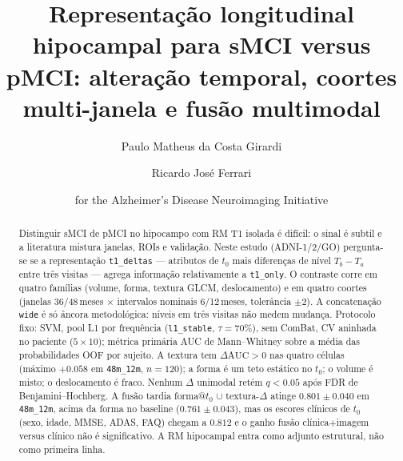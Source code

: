 \documentclass[review]{elsarticle}
\newcommand{\code}[1]{\texttt{#1}}
\begin{document}
	\begin{frontmatter}
		
		\title{Representação longitudinal hipocampal para sMCI versus pMCI:
			alteração temporal, coortes multi-janela e fusão multimodal}
		
		\author[ufscar]{Paulo Matheus da Costa Girardi}
		
		\author[ufscar]{Ricardo José Ferrari}
		
		
		\address[ufscar]{Department of Computing, Federal University of São Carlos, Rod.\ Washington Luis, Km 235, 13565-905, São Carlos, SP, Brazil}
		
		\author[]{for the Alzheimer's Disease Neuroimaging Initiative}
		
		\begin{abstract}
			Distinguir sMCI de pMCI no hipocampo com RM T1 isolada é difícil: o sinal é subtil e a literatura mistura janelas, ROIs e validação.
			Neste estudo (ADNI-1/2/GO) pergunta-se se a representação \code{t1\_deltas} --- atributos de $t_0$ mais diferenças de nível $T_b-T_a$ entre três visitas --- agrega informação relativamente a \code{t1\_only}.
			O contraste corre em quatro famílias (volume, forma, textura GLCM, deslocamento) e em quatro coortes (janelas 36/48\,meses $\times$ intervalos nominais 6/12\,meses, tolerância $\pm 2$).
			A concatenação \code{wide} é só âncora metodológica: níveis em três visitas não medem mudança.
			Protocolo fixo: SVM, pool L1 por frequência (\code{l1\_stable}, $\tau=70\%$), sem ComBat, CV aninhada no paciente ($5\times 10$); métrica primária AUC de Mann--Whitney sobre a média das probabilidades OOF por sujeito.
			A textura tem $\Delta\mathrm{AUC}>0$ nas quatro células (máximo $+0.058$ em \code{48m\_12m}, $n=120$); a forma é um teto estático no $t_0$; o volume é misto; o deslocamento é fraco.
			Nenhum $\Delta$ unimodal retém $q<0.05$ após FDR de Benjamini--Hochberg.
			A fusão tardia forma@$t_0$ $\cup$ textura-$\Delta$ atinge $0.801\pm0.040$ em \code{48m\_12m}, acima da forma no baseline ($0.761\pm0.043$), mas os escores clínicos de $t_0$ (sexo, idade, MMSE, ADAS, FAQ) chegam a $0.812$ e o ganho fusão clínica$+$imagem versus clínico não é significativo.
			A RM hipocampal entra como adjunto estrutural, não como primeira linha.
		\end{abstract}
		

\end{frontmatter}
\end{document}
